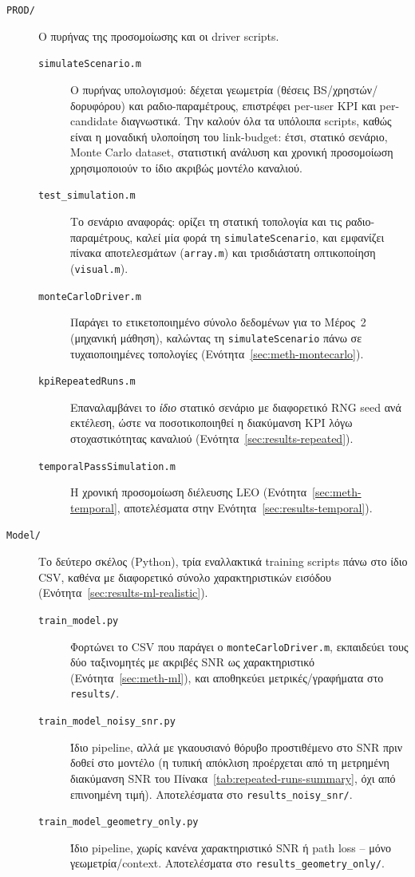\begin{description}
  \item[\texttt{PROD/}] Ο πυρήνας της προσομοίωσης και οι driver scripts.
  \begin{description}
    \item[\texttt{simulateScenario.m}] Ο πυρήνας υπολογισμού: δέχεται
      γεωμετρία (θέσεις BS/χρηστών/δορυφόρου) και ραδιο-παραμέτρους,
      επιστρέφει per-user KPI και per-candidate διαγνωστικά. Την καλούν
      όλα τα υπόλοιπα scripts, καθώς είναι η μοναδική υλοποίηση του
      link-budget: έτσι, στατικό σενάριο, Monte Carlo dataset, στατιστική
      ανάλυση και χρονική προσομοίωση χρησιμοποιούν το ίδιο ακριβώς
      μοντέλο καναλιού.
    \item[\texttt{test\_simulation.m}] Το σενάριο αναφοράς: ορίζει τη
      στατική τοπολογία και τις ραδιο-παραμέτρους, καλεί μία φορά τη
      \texttt{simulateScenario}, και εμφανίζει πίνακα αποτελεσμάτων
      (\texttt{array.m}) και τρισδιάστατη οπτικοποίηση (\texttt{visual.m}).
    \item[\texttt{monteCarloDriver.m}] Παράγει το ετικετοποιημένο σύνολο
      δεδομένων για το Μέρος~2 (μηχανική μάθηση), καλώντας τη
      \texttt{simulateScenario} πάνω σε τυχαιοποιημένες τοπολογίες
      (Ενότητα~\ref{sec:meth-montecarlo}).
    \item[\texttt{kpiRepeatedRuns.m}] Επαναλαμβάνει το \emph{ίδιο} στατικό
      σενάριο με διαφορετικό RNG seed ανά εκτέλεση, ώστε να ποσοτικοποιηθεί
      η διακύμανση KPI λόγω στοχαστικότητας καναλιού
      (Ενότητα~\ref{sec:results-repeated}).
    \item[\texttt{temporalPassSimulation.m}] Η χρονική προσομοίωση διέλευσης
      LEO (Ενότητα~\ref{sec:meth-temporal}, αποτελέσματα στην
      Ενότητα~\ref{sec:results-temporal}).
  \end{description}
  \item[\texttt{Model/}] Το δεύτερο σκέλος (Python), τρία εναλλακτικά
    training scripts πάνω στο ίδιο CSV, καθένα με διαφορετικό σύνολο
    χαρακτηριστικών εισόδου (Ενότητα~\ref{sec:results-ml-realistic}).
  \begin{description}
    \item[\texttt{train\_model.py}] Φορτώνει το CSV που παράγει ο
      \texttt{monteCarloDriver.m}, εκπαιδεύει τους δύο ταξινομητές με
      ακριβές SNR ως χαρακτηριστικό (Ενότητα~\ref{sec:meth-ml}), και
      αποθηκεύει μετρικές/γραφήματα στο \texttt{results/}.
    \item[\texttt{train\_model\_noisy\_snr.py}] Ίδιο pipeline, αλλά με
      γκαουσιανό θόρυβο προστιθέμενο στο SNR πριν δοθεί στο μοντέλο (η
      τυπική απόκλιση προέρχεται από τη μετρημένη διακύμανση SNR του
      Πίνακα~\ref{tab:repeated-runs-summary}, όχι από επινοημένη τιμή).
      Αποτελέσματα στο \texttt{results\_noisy\_snr/}.
    \item[\texttt{train\_model\_geometry\_only.py}] Ίδιο pipeline, χωρίς
      κανένα χαρακτηριστικό SNR ή path loss -- μόνο γεωμετρία/context.
      Αποτελέσματα στο \texttt{results\_geometry\_only/}.
  \end{description}
\end{description}

